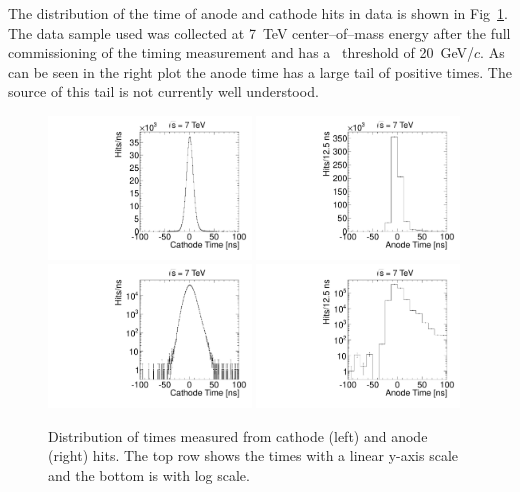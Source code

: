 The distribution of the time of anode and cathode hits in data is shown in Fig~\ref{fig:hittime}.
The data sample used was collected at 7~TeV center--of--mass energy after the full commissioning of the timing measurement and has a \pt\ threshold of 20~GeV/$c$.
As can be seen in the right plot the anode time has a large tail of positive times. The source of this tail is not currently well understood.

\begin{figure}
  \begin{center}
      \includegraphics[clip=true, trim=0.0cm 0cm 0.0cm 0cm, width=0.48\textwidth]{figures/timing/CathodeTime}
      \includegraphics[clip=true, trim=0.0cm 0cm 0.0cm 0cm, width=0.48\textwidth]{figures/timing/AnodeTime} \\
      \includegraphics[clip=true, trim=0.0cm 0cm 0.0cm 0cm, width=0.48\textwidth]{figures/timing/CathodeTimeLog}
      \includegraphics[clip=true, trim=0.0cm 0cm 0.0cm 0cm, width=0.48\textwidth]{figures/timing/AnodeTimeLog} \\
      \caption[Distribution of times of anode and cathode hits.]
      {Distribution of times measured from cathode (left) and anode (right) hits.
The top row shows the times with a linear y-axis scale and the bottom is with log scale.
	}
      \label{fig:hittime}
  \end{center}
\end{figure}

